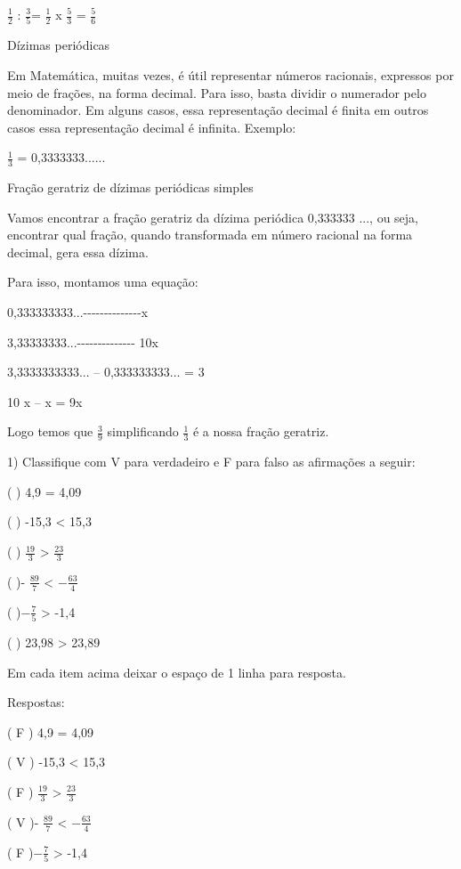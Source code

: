 \(\frac{1}{2}\) : \(\frac{3}{5}\)= \(\frac{1}{2}\) x \(\frac{5}{3}\) =
\(\frac{5}{6}\)

Dízimas periódicas

Em Matemática, muitas vezes, é útil representar números racionais,
expressos por meio de frações, na forma decimal. Para isso, basta
dividir o numerador pelo denominador. Em alguns casos, essa
representação decimal é finita em outros casos essa representação
decimal é infinita. Exemplo:

\(\frac{1}{3}\) = 0,3333333......

Fração geratriz de dízimas periódicas simples

Vamos encontrar a fração geratriz da dízima periódica 0,333333 ..., ou
seja, encontrar qual fração, quando transformada em número racional na
forma decimal, gera essa dízima.

Para isso, montamos uma equação:

0,333333333...-\/-\/-\/-\/-\/-\/-\/-\/-\/-\/-\/-\/-\/-x

3,33333333...-\/-\/-\/-\/-\/-\/-\/-\/-\/-\/-\/-\/-\/- 10x

3,3333333333... -- 0,333333333... = 3

10 x -- x = 9x

Logo temos que \(\frac{3}{9}\) simplificando \(\frac{1}{3}\) é a nossa
fração geratriz.


1) Classifique com V para verdadeiro e F para falso as afirmações a
seguir:

( ) 4,9 = 4,09

( ) -15,3 \textless{} 15,3

( ) \(\frac{19}{3}\) \textgreater{} \(\frac{23}{3}\)

( )- \(\frac{89}{7}\) \textless{} \(- \frac{63}{4}\)

( )\(- \frac{7}{5}\) \textgreater{} -1,4

( ) 23,98 \textgreater{} 23,89

Em cada item acima deixar o espaço de 1 linha para resposta.

Respostas:

( F ) 4,9 = 4,09

( V ) -15,3 \textless{} 15,3

( F ) \(\frac{19}{3}\) \textgreater{} \(\frac{23}{3}\)

( V )- \(\frac{89}{7}\) \textless{} \(- \frac{63}{4}\)

( F )\(- \frac{7}{5}\) \textgreater{} -1,4

